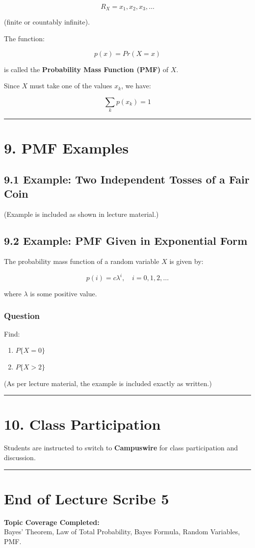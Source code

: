 \documentclass[12pt]{article}
\begin{document}
\[
R_X = x_1, x_2, x_3, \dots
\]

(finite or countably infinite).

The function:

\[
p(x) = Pr(X=x)
\]

is called the \textbf{Probability Mass Function (PMF)} of $X$.

Since $X$ must take one of the values $x_k$, we have:

\[
\sum_k p(x_k) = 1
\]

\hrule
\vspace{1em}

\section*{\textbf{9. PMF Examples}}

\subsection*{\textbf{9.1 Example: Two Independent Tosses of a Fair Coin}}

(Example is included as shown in lecture material.)

\subsection*{\textbf{9.2 Example: PMF Given in Exponential Form}}

The probability mass function of a random variable $X$ is given by:

\[
p(i) = c\lambda^i,\quad i = 0,1,2,\dots
\]

where $\lambda$ is some positive value.

\subsubsection*{\textbf{Question}}

Find:

\begin{enumerate}
    \item $P\{X=0\}$
    \item $P\{X>2\}$
\end{enumerate}

(As per lecture material, the example is included exactly as written.)

\hrule
\vspace{1em}

\section*{\textbf{10. Class Participation}}

Students are instructed to switch to \textbf{Campuswire} for class participation and discussion.

\hrule
\vspace{1em}

\section*{\textbf{End of Lecture Scribe 5}}

\textbf{Topic Coverage Completed:} \\
Bayes’ Theorem, Law of Total Probability, Bayes Formula, Random Variables, PMF.
\end{document}
